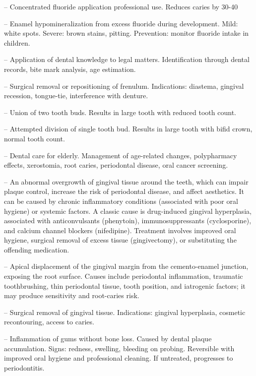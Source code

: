 -- Concentrated fluoride application professional use. Reduces caries by 30-40%

-- Enamel hypomineralization from excess fluoride during development. Mild: white spots. Severe: brown stains, pitting. Prevention: monitor fluoride intake in children.

-- Application of dental knowledge to legal matters. Identification through dental records, bite mark analysis, age estimation.

-- Surgical removal or repositioning of frenulum. Indications: diastema, gingival recession, tongue-tie, interference with denture.

-- Union of two tooth buds. Results in large tooth with reduced tooth count.

-- Attempted division of single tooth bud. Results in large tooth with bifid crown, normal tooth count.

-- Dental care for elderly. Management of age-related changes, polypharmacy effects, xerostomia, root caries, periodontal disease, oral cancer screening.

-- An abnormal overgrowth of gingival tissue around the teeth, which can impair plaque control, increase the risk of periodontal disease, and affect aesthetics. It can be caused by chronic inflammatory conditions (associated with poor oral hygiene) or systemic factors. A classic cause is drug-induced gingival hyperplasia, associated with anticonvulsants (phenytoin), immunosuppressants (cyclosporine), and calcium channel blockers (nifedipine). Treatment involves improved oral hygiene, surgical removal of excess tissue (gingivectomy), or substituting the offending medication.

-- Apical displacement of the gingival margin from the cemento-enamel junction, exposing the root surface. Causes include periodontal inflammation, traumatic toothbrushing, thin periodontal tissue, tooth position, and iatrogenic factors; it may produce sensitivity and root-caries risk.

-- Surgical removal of gingival tissue. Indications: gingival hyperplasia, cosmetic recontouring, access to caries.

-- Inflammation of gums without bone loss. Caused by dental plaque accumulation. Signs: redness, swelling, bleeding on probing. Reversible with improved oral hygiene and professional cleaning. If untreated, progresses to periodontitis.


